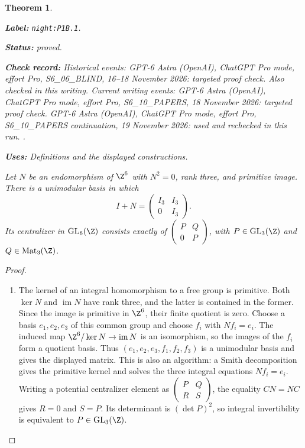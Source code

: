 \documentclass[11pt,a4paper]{article}
\newtheorem{theorem}{Theorem}[section]
\theoremstyle{definition}
\newcommand{\StatementRecord}[4]{\par\smallskip\begingroup\upshape\raggedright\noindent\textbf{Label:} \nolinkurl{#1}.\par\noindent\textbf{Status:} #2.\par\noindent\textbf{Check record:} #3.\par\noindent\textbf{Uses:} #4.\par\endgroup\smallskip}
\begin{document}
\begin{theorem}\label{night:P1B.1}
\StatementRecord{night:P1B.1}{proved}{Historical events: GPT-6 Astra (OpenAI), ChatGPT Pro mode, effort Pro, S6\_06\_BLIND, 16--18 November 2026: targeted proof check. Also checked in this writing. Current writing events: GPT-6 Astra (OpenAI), ChatGPT Pro mode, effort Pro, S6\_10\_PAPERS, 18 November 2026: targeted proof check. GPT-6 Astra (OpenAI), ChatGPT Pro mode, effort Pro, S6\_10\_PAPERS continuation, 19 November 2026: used and rechecked in this run. }{Definitions and the displayed constructions}
Let $N$ be an endomorphism of $\Z^6$ with $N^2=0$, rank three,
and primitive image. There is a unimodular basis in which
\[
 I+N=\begin{pmatrix}I_3&I_3\\0&I_3\end{pmatrix}.
\]
Its centralizer in $\operatorname{GL}_6(\Z)$ consists exactly of
$\left(\begin{smallmatrix}P&Q\\0&P\end{smallmatrix}\right)$,
with $P\in\operatorname{GL}_3(\Z)$ and $Q\in\operatorname{Mat}_3(\Z)$.
\end{theorem}
\begin{proof}
\begin{enumerate}[label=\arabic*.]
\item The kernel of an integral homomorphism to a free group is
primitive. Both $\ker N$ and $\operatorname{im}N$ have rank three,
and the latter is contained in the former. Since the image is
primitive in $\Z^6$, their finite quotient is zero. Choose a basis
$e_1,e_2,e_3$ of this common group and choose $f_i$ with $Nf_i=e_i$.
The induced map $\Z^6/\ker N\to\operatorname{im}N$ is an
isomorphism, so the images of the $f_i$ form a quotient basis.
Thus $(e_1,e_2,e_3,f_1,f_2,f_3)$ is a unimodular basis and gives
the displayed matrix. This is also an algorithm: a Smith
decomposition gives the primitive kernel and solves the three
integral equations $Nf_i=e_i$.
Writing a potential centralizer element as
$\left(\begin{smallmatrix}P&Q\\R&S\end{smallmatrix}\right)$,
the equality $CN=NC$ gives $R=0$ and $S=P$.
Its determinant is $(\det P)^2$, so integral invertibility
is equivalent to $P\in\operatorname{GL}_3(\Z)$.

\end{enumerate}
\end{proof}
\end{document}
